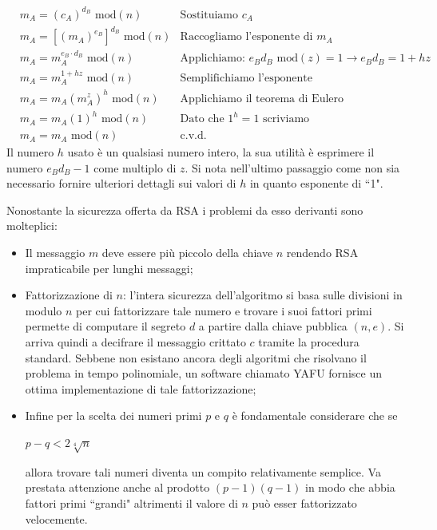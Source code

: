 \documentclass[a4paper,12pt]{tesiinfo}
\begin{document}
\begin{align*}
  &m_A = (c_A)^{d_B} \text{ mod}(n) & \text{Sostituiamo $c_A$}\\
  &m_A = [(m_A)^{e_B}]^{d_B} \text{ mod}(n) & \text{Raccogliamo l'esponente di }m_A\\
  &m_A = m_A^{e_B \cdot d_B} \text{ mod}(n) & \text{Applichiamo: $e_Bd_B$ mod$(z) = 1 \to e_Bd_B=1+hz$}\\
  &m_A = m_A^{1+hz} \text{ mod}(n) & \text{Semplifichiamo l'esponente}\\
  &m_A = m_A(m_A^z)^h \text{ mod}(n) & \text{Applichiamo il teorema di Eulero}\\
  &m_A = m_A(1)^h \text{ mod}(n) & \text{Dato che $1^h = 1$ scriviamo}\\
  &m_A = m_A \text{ mod}(n) & \text{c.v.d.}
\end{align*}
Il numero $h$ usato \`e un qualsiasi numero intero, la sua utilit\`a \`e esprimere il numero $e_Bd_B -1$ come multiplo di $z$. Si nota nell'ultimo passaggio come non sia necessario fornire ulteriori dettagli sui valori di $h$ in quanto esponente di ``1".

Nonostante la sicurezza offerta da RSA i problemi da esso derivanti sono molteplici: 
\begin{itemize}
  \item Il messaggio $m$ deve essere pi\`u piccolo della chiave $n$ rendendo RSA impraticabile per lunghi messaggi;
  \item Fattorizzazione di $n$: l'intera sicurezza dell'algoritmo si basa sulle divisioni in modulo $n$ per cui fattorizzare tale numero e trovare i suoi fattori primi permette di computare il segreto $d$ a partire dalla chiave pubblica $(n, e)$. Si arriva quindi a decifrare il messaggio crittato $c$ tramite la procedura standard. Sebbene non esistano ancora degli algoritmi che risolvano il problema in tempo polinomiale, un software chiamato YAFU fornisce un ottima implementazione di tale fattorizzazione;
  \item Infine per la scelta dei numeri primi $p$ e $q$ \`e fondamentale considerare che se 
  \begin{center}
   $p-q < 2\sqrt[4]{n}$
  \end{center}
  allora trovare tali numeri diventa un compito relativamente semplice. Va prestata attenzione anche al prodotto $(p-1)(q-1)$ in modo che abbia fattori primi ``grandi" altrimenti il valore di $n$ pu\`o esser fattorizzato velocemente.\\
\end{itemize}
\end{document}
